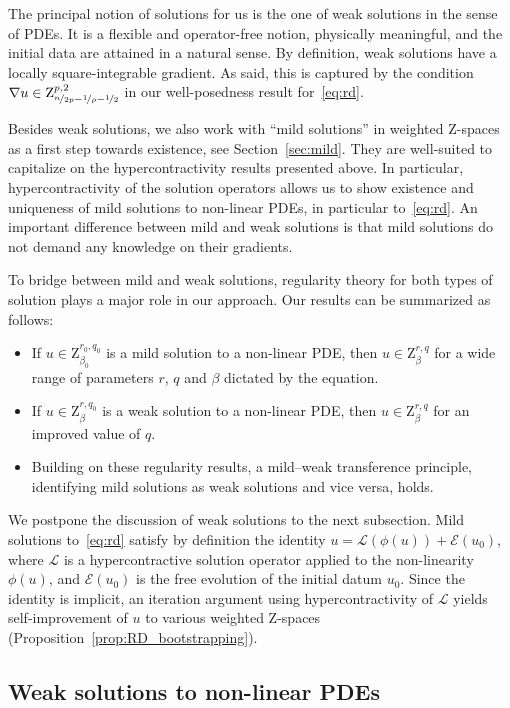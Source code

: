 \documentclass[11pt, leqno]{amsart}
\theoremstyle{definition}
\newcommand{\Z}{\mathrm{Z}}
\newcommand{\Ext}{\mathcal{E}}
\newcommand{\Soll}{\mathcal{L}}
\begin{document}
	The principal notion of solutions for us is the one of weak solutions in the sense of PDEs. It is a flexible and operator-free notion, physically meaningful, and the initial data are attained in a natural sense. By definition, weak solutions have a locally square-integrable gradient. As said, this is captured by the condition $\nabla u \in \Z^{p,2}_{\nicefrac{n}{2p}-\nicefrac{1}{\rho} - \nicefrac{1}{2}}$ in our well-posedness result for~\eqref{eq:rd}.

	Besides weak solutions, we also work with \enquote{mild solutions} in weighted $\Z$-spaces as a first step towards existence, see Section~\ref{sec:mild}. They are well-suited to capitalize on the hypercontractivity results presented above.
	In particular, hypercontractivity of the solution operators allows us to show existence and uniqueness of mild solutions to non-linear PDEs, in particular to~\eqref{eq:rd}.
	An important difference between mild and weak solutions is that mild solutions do not demand any knowledge on their gradients.

	To bridge between mild and weak solutions, regularity theory for both types of solution plays a major role in our approach. Our results can be summarized as follows:
	\begin{itemize}
		\item If $u \in \Z^{r_0,q_0}_{\beta_0}$ is a mild solution to a non-linear PDE, then $u \in \Z^{r,q}_\beta$ for a wide range of parameters $r$, $q$ and $\beta$ dictated by the equation.
		\item If $u \in \Z^{r,q_0}_\beta$ is a weak solution to a non-linear PDE, then $u \in \Z^{r,q}_\beta$ for an improved value of $q$.
		\item Building on these regularity results, a mild--weak transference principle, identifying mild solutions as weak solutions and vice versa, holds.
	\end{itemize}

	We postpone the discussion of weak solutions to the next subsection. Mild solutions to~\eqref{eq:rd} satisfy by definition the identity $u = \Soll(\phi(u)) + \Ext(u_0)$, where $\Soll$ is a hypercontractive solution operator applied to the non-linearity $\phi(u)$, and $\Ext(u_0)$ is the free evolution of the initial datum $u_0$. Since the identity is implicit, an iteration argument using hypercontractivity of $\Soll$ yields self-improvement of $u$ to various weighted $\Z$-spaces (Proposition~\ref{prop:RD_bootstrapping}).

	\subsection{Weak solutions to non-linear PDEs}
	\label{subsec:intro_weak}
\end{document}
